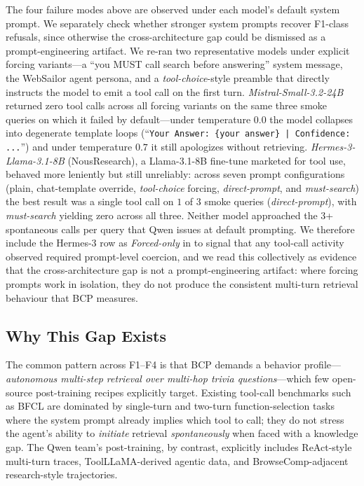 \documentclass[11pt]{article}
\begin{document}
The four failure modes above are observed under each model's default
system prompt. We separately check whether stronger system prompts
recover F1-class refusals, since otherwise the cross-architecture
gap could be dismissed as a prompt-engineering artifact.
We re-ran two representative models under explicit forcing
variants---a ``you MUST call search before answering'' system
message, the WebSailor agent persona, and a
\emph{tool-choice}-style preamble that directly instructs the model
to emit a tool call on the first turn. \textit{Mistral-Small-3.2-24B}
returned zero tool calls across all forcing variants on the same
three smoke queries on which it failed by default---under temperature
$0.0$ the model collapses into degenerate template loops
(``\texttt{Your Answer: \{your answer\} | Confidence: ...}'') and
under temperature $0.7$ it still apologizes without retrieving.
\textit{Hermes-3-Llama-3.1-8B} (NousResearch), a Llama-3.1-8B
fine-tune marketed for tool use, behaved more leniently but still
unreliably: across seven prompt configurations (plain, chat-template
override, \emph{tool-choice} forcing, \emph{direct-prompt}, and
\emph{must-search}) the best result was a single tool call on
$1$ of $3$ smoke queries (\emph{direct-prompt}), with
\emph{must-search} yielding zero across all three. Neither model
approached the $3$+ spontaneous calls per query that Qwen issues at
default prompting. We therefore include the Hermes-3 row as
\emph{Forced-only} in  to signal that any
tool-call activity observed required prompt-level coercion, and we
read this collectively as evidence that the cross-architecture gap
is not a prompt-engineering artifact: where forcing prompts work in
isolation, they do not produce the consistent multi-turn retrieval
behaviour that BCP measures.

\subsection{Why This Gap Exists}

The common pattern across F1--F4 is that BCP demands a behavior
profile---\textit{autonomous multi-step retrieval over multi-hop
trivia questions}---which few open-source post-training recipes
explicitly target. Existing tool-call benchmarks such as BFCL are
dominated by single-turn and two-turn function-selection tasks where
the system prompt already implies which tool to call; they do not
stress the agent's ability to \emph{initiate} retrieval
\emph{spontaneously} when faced with a knowledge gap. The Qwen team's
post-training, by contrast, explicitly includes ReAct-style multi-turn
traces, ToolLLaMA-derived agentic data, and BrowseComp-adjacent
research-style trajectories.
\end{document}
